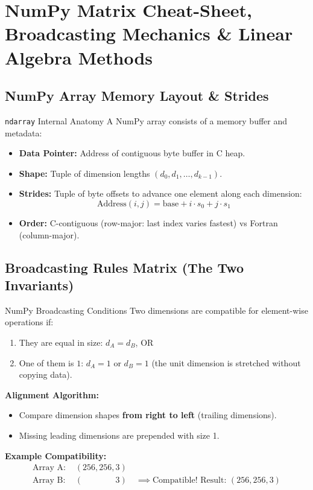 \chapter{NumPy Matrix Cheat-Sheet, Broadcasting Mechanics \& Linear Algebra Methods}
\label{chap:numpy-linear-algebra}

\section{NumPy Array Memory Layout \& Strides}
\begin{formulabox}{\texttt{ndarray} Internal Anatomy}
A NumPy array consists of a memory buffer and metadata:
\begin{itemize}[leftmargin=1.5em, itemsep=2pt]
    \item \textbf{Data Pointer:} Address of contiguous byte buffer in C heap.
    \item \textbf{Shape:} Tuple of dimension lengths $(d_0, d_1, \dots, d_{k-1})$.
    \item \textbf{Strides:} Tuple of byte offsets to advance one element along each dimension:
    \begin{equation}
    \text{Address}(i, j) = \text{base} + i \cdot s_0 + j \cdot s_1
    \end{equation}
    \item \textbf{Order:} C-contiguous (row-major: last index varies fastest) vs Fortran (column-major).
\end{itemize}
\end{formulabox}

\section{Broadcasting Rules Matrix (The Two Invariants)}
\begin{formulabox}{NumPy Broadcasting Conditions}
Two dimensions are compatible for element-wise operations if:
\begin{enumerate}[leftmargin=1.5em, itemsep=2pt]
    \item They are equal in size: $d_A = d_B$, OR
    \item One of them is $1$: $d_A = 1$ or $d_B = 1$ (the unit dimension is stretched without copying data).
\end{enumerate}
\textbf{Alignment Algorithm:}
\begin{itemize}[leftmargin=1em]
    \item Compare dimension shapes \textbf{from right to left} (trailing dimensions).
    \item Missing leading dimensions are prepended with size 1.
\end{itemize}
\textbf{Example Compatibility:}
\begin{align*}
\text{Array A: } & (256, 256, 3) \\
\text{Array B: } & (\phantom{256, 256, } 3) \quad \implies \text{Compatible! Result: } (256, 256, 3)
\end{align*}
\end{formulabox}

